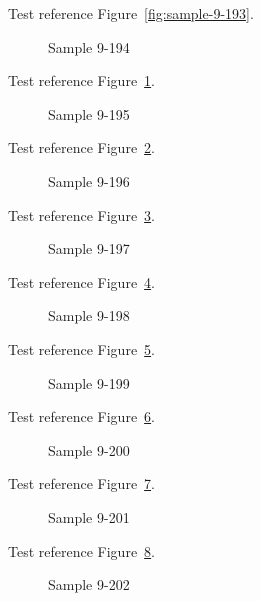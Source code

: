 Test reference Figure~\ref{fig:sample-9-193}.

\begin{figure}[tbhp]
\caption{Sample 9-194}
\label{fig:sample-9-194}
\end{figure}

Test reference Figure~\ref{fig:sample-9-194}.

\begin{figure}[tbhp]
\caption{Sample 9-195}
\label{fig:sample-9-195}
\end{figure}

Test reference Figure~\ref{fig:sample-9-195}.

\begin{figure}[tbhp]
\caption{Sample 9-196}
\label{fig:sample-9-196}
\end{figure}

Test reference Figure~\ref{fig:sample-9-196}.

\begin{figure}[tbhp]
\caption{Sample 9-197}
\label{fig:sample-9-197}
\end{figure}

Test reference Figure~\ref{fig:sample-9-197}.

\begin{figure}[tbhp]
\caption{Sample 9-198}
\label{fig:sample-9-198}
\end{figure}

Test reference Figure~\ref{fig:sample-9-198}.

\begin{figure}[tbhp]
\caption{Sample 9-199}
\label{fig:sample-9-199}
\end{figure}

Test reference Figure~\ref{fig:sample-9-199}.

\begin{figure}[tbhp]
\caption{Sample 9-200}
\label{fig:sample-9-200}
\end{figure}

Test reference Figure~\ref{fig:sample-9-200}.

\begin{figure}[tbhp]
\caption{Sample 9-201}
\label{fig:sample-9-201}
\end{figure}

Test reference Figure~\ref{fig:sample-9-201}.

\begin{figure}[tbhp]
\caption{Sample 9-202}
\label{fig:sample-9-202}
\end{figure}

